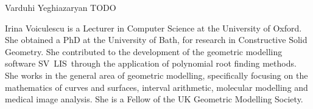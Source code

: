 \documentclass[10pt,twocolumn,twoside]{IEEEtran}
\newcommand{\svlis}{%
\mbox{\scriptsize S\hspace{-0.2mm}\footnotesize V\hspace{-0.2mm}%
\normalsize L\hspace{0.1mm}\footnotesize I\hspace{0.2mm}\scriptsize S\ }}
\begin{document}
\begin{IEEEbiography}[]{Varduhi Yeghiazaryan}
TODO
\end{IEEEbiography}

\begin{IEEEbiography}{Irina Voiculescu}
is a Lecturer in Computer Science at the University of Oxford. She obtained a PhD at the University of Bath, for research in Constructive Solid Geometry. She contributed to the development of the geometric modelling software \svlis through the application of polynomial root finding methods. She works in the general area of geometric modelling, specifically focusing on the mathematics of curves and surfaces, interval arithmetic, molecular modelling and medical image analysis. She is a Fellow of the UK Geometric Modelling Society.
\end{IEEEbiography}
\end{document}
